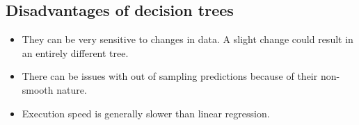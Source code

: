 \subsection{Disadvantages of decision trees}

\begin{itemize}
  \item They can be very sensitive to changes in data. A slight change could result in an entirely different tree.
  \item There can be issues with out of sampling predictions because of their non-smooth nature.
  \item Execution speed is generally slower than linear regression.
\end{itemize}
